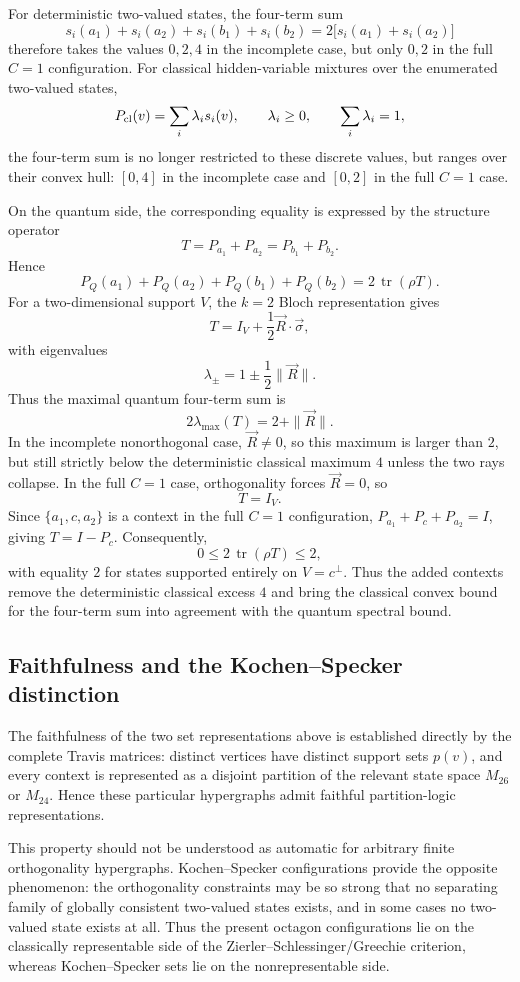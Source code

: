\documentclass[
  twocolumn,
  aps,
  pra,
  floatfix,
  amsmath,amssymb,
  longbibliography
]{revtex4-2}
\theoremstyle{definition}
\theoremstyle{remark}
\begin{document}
For deterministic two-valued states, the four-term sum
\[
s_i(a_1)+s_i(a_2)+s_i(b_1)+s_i(b_2)
=
2\bigl[s_i(a_1)+s_i(a_2)\bigr]
\]
therefore takes the values \(0,2,4\) in the incomplete case, but only
\(0,2\) in the full \(C=1\) configuration. For classical hidden-variable
mixtures over the enumerated two-valued states,
\[
P_{\rm cl}(v)=\sum_i \lambda_i s_i(v),\qquad
\lambda_i\ge 0,\qquad \sum_i\lambda_i=1,
\]
the four-term sum is no longer restricted to these discrete values, but
ranges over their convex hull: \([0,4]\) in the incomplete case and
\([0,2]\) in the full \(C=1\) case.

On the quantum side, the corresponding equality is expressed by the
structure operator
\[
T=P_{a_1}+P_{a_2}=P_{b_1}+P_{b_2}.
\]
Hence
\[
P_Q(a_1)+P_Q(a_2)+P_Q(b_1)+P_Q(b_2)
=
2\,\operatorname{tr}(\rho T).
\]
For a two-dimensional support \(V\), the \(k=2\) Bloch representation gives
\[
T=I_V+\frac12 \vec R\cdot \vec\sigma,
\]
with eigenvalues
\[
\lambda_\pm=1\pm \frac12\|\vec R\|.
\]
Thus the maximal quantum four-term sum is
\[
2\lambda_{\max}(T)=2+\|\vec R\|.
\]
In the incomplete nonorthogonal case, \(\vec R\neq 0\), so this maximum is
larger than \(2\), but still strictly below the deterministic classical
maximum \(4\) unless the two rays collapse. In the full \(C=1\) case,
orthogonality forces \(\vec R=0\), so
\[
T=I_V.
\]
Since $\{a_1,c,a_2\}$ is a context in the full \(C=1\)
configuration, $P_{a_1}+P_c+P_{a_2}=I$, giving $T=I-P_c$.
Consequently,
\[
0\le 2\,\operatorname{tr}(\rho T)\le 2,
\]
with equality \(2\) for states supported entirely on \(V=c^\perp\). Thus
the added contexts remove the deterministic classical excess \(4\) and
bring the classical convex bound for the four-term sum into agreement
with the quantum spectral bound.

\subsection{Faithfulness and the Kochen--Specker distinction}

The faithfulness of the two set representations above is established
directly by the complete Travis matrices: distinct vertices have distinct
support sets \(p(v)\), and every context is represented as a disjoint
partition of the relevant state space \(M_{26}\) or \(M_{24}\). Hence these
particular hypergraphs admit faithful partition-logic representations.

This property should not be understood as automatic for arbitrary finite
orthogonality hypergraphs. Kochen--Specker configurations provide the
opposite phenomenon: the orthogonality constraints may be so strong that
no separating family of globally consistent two-valued states exists, and
in some cases no two-valued state exists at all. Thus the present octagon
configurations lie on the classically representable side of the
Zierler--Schlessinger/Greechie criterion, whereas Kochen--Specker sets lie
on the nonrepresentable side.


\end{document}
